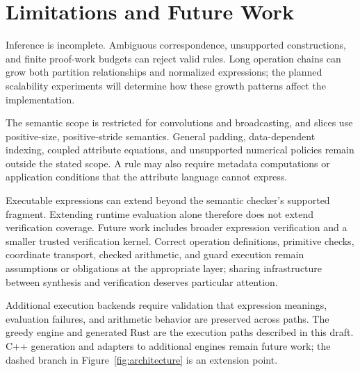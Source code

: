\FloatBarrier
\section{Limitations and Future Work}
\label{sec:limitations}
Inference is incomplete. Ambiguous correspondence, unsupported constructions,
and finite proof-work budgets can reject valid rules. Long operation chains
can grow both partition relationships and normalized expressions; the planned
scalability experiments will determine how these growth patterns affect the
implementation.

The semantic scope is restricted for convolutions and broadcasting, and slices
use positive-size, positive-stride semantics. General padding, data-dependent
indexing, coupled attribute equations, and unsupported numerical policies
remain outside the stated scope. A rule may also require metadata computations
or application conditions that the attribute language cannot express.

Executable expressions can extend beyond the semantic checker's supported
fragment. Extending runtime evaluation alone therefore does not extend
verification coverage. Future work includes broader expression verification
and a smaller trusted verification kernel. Correct operation definitions,
primitive checks, coordinate transport, checked arithmetic, and guard
execution remain assumptions or obligations at the appropriate layer;
sharing infrastructure between synthesis and verification deserves particular
attention.

Additional execution backends require validation that expression meanings,
evaluation failures, and arithmetic behavior are preserved across paths.
The greedy engine and generated Rust are the execution paths described in
this draft. C++ generation and adapters to additional engines remain future
work; the dashed branch in Figure~\ref{fig:architecture} is an extension point.
